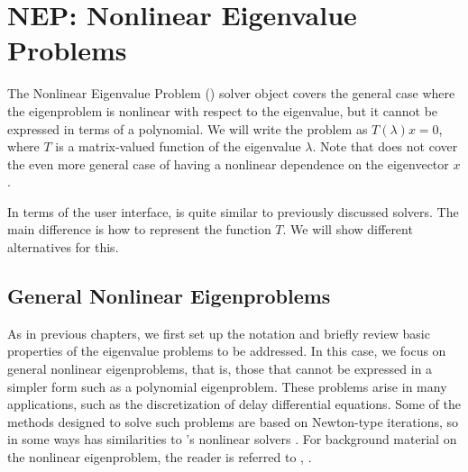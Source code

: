 \chapter{\label{cap:nep}NEP: Nonlinear Eigenvalue Problems}


\noindent The Nonlinear Eigenvalue Problem () solver object covers the general case where the eigenproblem is nonlinear with respect to the eigenvalue, but it cannot be expressed in terms of a polynomial. We will write the problem as $T(\lambda)x=0$, where $T$ is a matrix-valued function of the eigenvalue $\lambda$. Note that  does not cover the even more general case of having a nonlinear dependence on the eigenvector $x$.

In terms of the user interface,  is quite similar to previously discussed solvers. The main difference is how to represent the function $T$. We will show different alternatives for this.

\section{\label{sec:nep}General Nonlinear Eigenproblems}

As in previous chapters, we first set up the notation and briefly review basic properties of the eigenvalue problems to be addressed. In this case, we focus on general nonlinear eigenproblems, that is, those that cannot be expressed in a simpler form such as a polynomial eigenproblem. These problems arise in many applications, such as the discretization of delay differential equations. Some of the methods designed to solve such problems are based on Newton-type iterations, so in some ways  has similarities to \petsc's nonlinear solvers . For background material on the nonlinear eigenproblem, the reader is referred to \citep{Guttel:2017:NEP}, \citep{Mehrmann:2004:NEP}.

